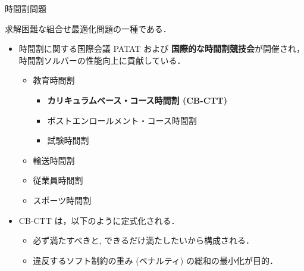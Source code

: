 \documentclass[11pt,dvipdfmx]{beamer}
\begin{document}
\begin{frame}{時間割問題}
  \begin{block}{}\centering
    求解困難な組合せ最適化問題の一種である．
  \end{block}
  \begin{itemize}
  \item 時間割に関する国際会議 PATAT および
    \alert{\bf 国際的な時間割競技会}が開催され，
    時間割ソルバーの性能向上に貢献している．
    \begin{itemize}
    \item 教育時間割
      \begin{itemize}
      \item \alert{\bf カリキュラムベース・コース時間割 (CB-CTT)}
      \item ポストエンロールメント・コース時間割
      \item 試験時間割
      \end{itemize}
    \item 輸送時間割
    \item 従業員時間割
    \item スポーツ時間割
    \end{itemize}
  \item CB-CTT は，以下のように定式化される．
    \begin{itemize}
    \item 必ず満たすべきと, 
    できるだけ満たしたいから構成される．
    \item 違反するソフト制約の重み (ペナルティ) の総和の最小化が目的．
    \end{itemize}
  \end{itemize}
\end{frame}
\end{document}
